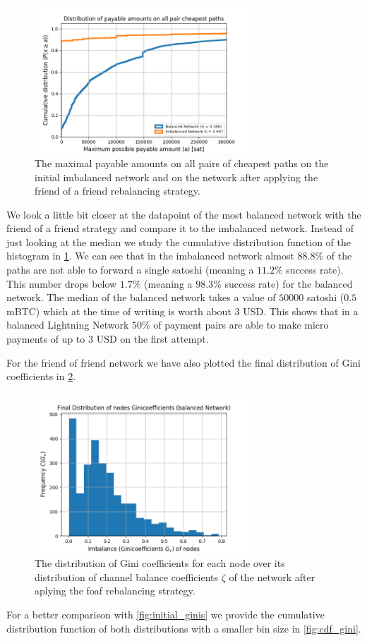 \documentclass[a4paper]{paper}
\begin{document}
\begin{figure}
 \centering
 \includegraphics[width=8cm]{code/vs/fig/maximum_payable_amount_all_pair_chepest_paths_balanced_network.png}
 \caption{The maximal payable amounts on all pairs of cheapest paths on the initial imbalanced network and on the network after applying the friend of a friend rebalancing strategy.}
 \label{fig:cdf_paymentsize}
\end{figure}
We look a little bit closer at the datapoint of the most balanced network with the friend of a friend strategy and compare it to the imbalanced network.
Instead of just looking at the median we study the cumulative distribution function of the histogram in \cref{fig:cdf_paymentsize}.
We can see that in the imbalanced network almost $88.8\%$ of the paths are not able to forward a single satoshi (meaning a $11.2\%$ success rate).
This number drops below $1.7\%$ (meaning a $98.3\%$ success rate) for the balanced network.
The median of the balanced network takes a value of $50000$ satoshi ($0.5$ mBTC) which at the time of writing is worth about $3$ USD.
This shows that in a balanced Lightning Network $50\%$ of payment pairs are able to make micro payments of up to $3$ USD on the first attempt. 

For the friend of friend network we have also plotted the final distribution of Gini coefficients in \cref{fig:final_gini}. 
\begin{figure}
 \centering
 \includegraphics[width=8cm]{code/vs/fig/Final_ginis_after_rebalancing.png}
 \caption{The distribution of Gini coefficients for each node over its distribution of channel balance coefficients $\zeta$ of the network after aplying the foaf rebalancing strategy.}
 \label{fig:final_gini}
\end{figure}
For a better comparison with \cref{fig:initial_ginis} we provide the cumulative distribution function of both distributions with a smaller bin size in \cref{fig:cdf_gini}.
\end{document}
